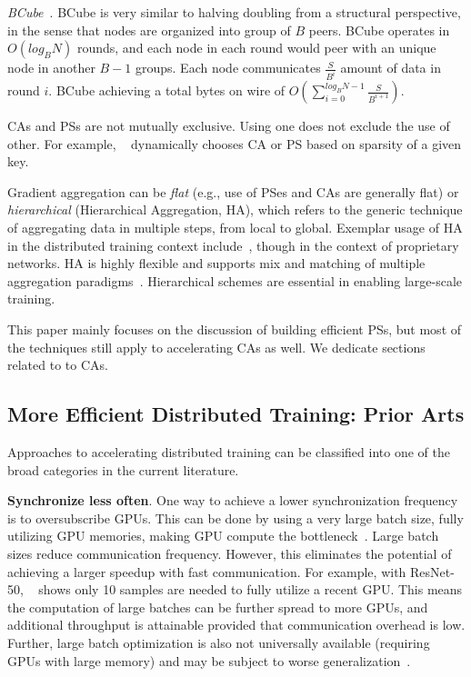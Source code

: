 \noindent\textit{BCube}~\cite{glooalgo70:online}. BCube is very similar to halving doubling from a structural perspective, in the sense that nodes are organized into group of $B$ peers. BCube operates in $O(log_BN)$ rounds, and each node in each round would peer with an unique node in another $B-1$ groups. Each node communicates $\frac{S}{B^i}$ amount of data in round $i$. BCube achieving a total bytes on wire of $O(\sum_{i=0}^{log_BN-1}\frac{S}{B^{i+1}})$.

CAs and PSs are not mutually exclusive. Using one does not exclude the use of other. For example, ~\cite{10.1145/3302424.3303957} dynamically chooses CA or PS based on sparsity of a given key.

Gradient aggregation can be \textit{flat} (e.g., use of PSes and CAs are generally flat) or \textit{hierarchical} (Hierarchical Aggregation, HA), which refers to the generic technique of aggregating data in multiple steps, from local to global. Exemplar usage of HA in the distributed training context include~\cite{firecaffe,choblueconnect,Geng:2018:HHP:3229543.3229544,sysmlblueconnect}, though in the context of proprietary networks. HA is highly flexible and supports mix and matching of multiple aggregation paradigms~\cite{topoawarempi, cool}. Hierarchical schemes are essential in enabling large-scale training. 

This paper mainly focuses on the discussion of building efficient PSs, but most of the techniques still apply to accelerating CAs as well. We dedicate sections related to \cmpi to CAs. 

\subsection{More Efficient Distributed Training: Prior Arts}
Approaches to accelerating distributed training can be classified into one of the broad categories in the current literature.

\noindent\textbf{Synchronize less often}. One way to achieve a lower synchronization frequency is to oversubscribe GPUs. This can be done by using a very large batch size, fully utilizing GPU memories, making GPU compute the bottleneck~\cite{Nowanyon13:online, ImageNetIn1Hour, sridharan2018scaleout, jia2018highly, you2019large,you2017large}. Large batch sizes reduce communication frequency. However, this eliminates the potential of achieving a larger speedup with fast communication. For example, with ResNet-50, ~\cite{Shen2018NexusA} shows only 10 samples are needed to fully utilize a recent GPU. This means the computation of large batches can be further spread to more GPUs, and additional throughput is attainable provided that communication overhead is low. Further, large batch optimization is also not universally available (requiring GPUs with large memory) and may be subject to worse generalization~\cite{keskar2016large}.

